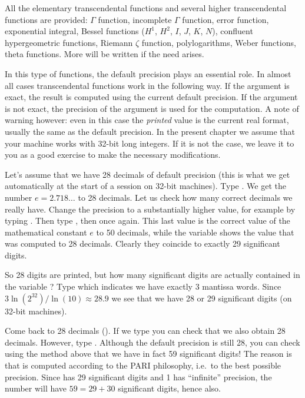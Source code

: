 All the elementary transcendental functions and several higher transcendental
functions are provided: $\Gamma$ function, incomplete $\Gamma$ function, error
function, exponential integral, Bessel functions ($H^1$, $H^2$, $I$, $J$,
$K$, $N$), confluent hypergeometric functions, Riemann $\zeta$ function,
polylogarithms, Weber functions, theta functions. More will be written if the
need arises.

In this type of functions, the default precision plays an essential role.
In almost all cases transcendental functions work in the following way.
If the argument is exact, the result is computed using the current
default precision. If the argument is not exact, the precision of the
argument is used for the computation. A note of warning however: even in this
case the \emph{printed} value is the current real format, usually the
same as the default precision. In the present chapter we assume that your
machine works with 32-bit long integers. If it is not the case, we leave it
to you as a good exercise to make the necessary modifications.

Let's assume that we have 28 decimals of default precision (this is what we
get automatically at the start of a  session on 32-bit machines). Type
. We get the number $e=2.718\dots$ to 28 decimals. Let us check
how many correct decimals we really have. Change the precision to a
substantially higher value, for example by typing . Then type
, then  once again. This last value is the correct value
of the mathematical constant $e$ to 50 decimals, while the variable 
shows the value that was computed to 28 decimals. Clearly they coincide to
exactly 29 significant digits.

So 28 digits are printed, but how many significant digits are actually
contained in the variable ? Type  which indicates we have
exactly $3$ mantissa words. Since $3\ln(2^{32}) / \ln(10)\approx28.9$ we see
that we have 28 or 29 significant digits (on 32-bit machines).

\smallskip
Come back to 28 decimals (). If we type 
you can check that we also obtain 28 decimals. However, type
. Although the default precision is still 28,
you can check using the method above that we have in fact 59 significant
digits! The reason is that  is computed according to the PARI
philosophy, i.e.~to the best possible precision. Since  has 29
significant digits and 1 has ``infinite'' precision, the number  will have $59=29+30$ significant digits, hence  also.

